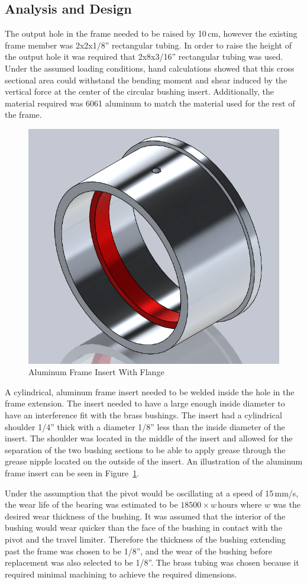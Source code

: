 \subsection{Analysis and Design}
The output hole in the frame needed to be raised by 10\,cm, however the existing frame member was 2x2x1/8'' rectangular tubing. In order to raise the height of the output hole it was required that 2x8x3/16'' rectangular tubing was used. Under the assumed loading conditions, hand calculations showed that this cross sectional area could withstand the bending moment and shear induced by the vertical force at the center of the circular bushing insert. Additionally, the material required was 6061 aluminum to match the material used for the rest of the frame. 
\begin{figure}[H]
\centering
\includegraphics[width=0.25\linewidth]{./images/frame_insert_iso_rndr}
\caption{Aluminum Frame Insert With Flange}
\label{fig:frame_insert_iso_rndr}
\end{figure}

A cylindrical, aluminum frame insert needed to be welded inside the hole in the frame extension. The insert needed to have a large enough inside diameter to have an interference fit with the brass bushings. The insert had a cylindrical shoulder 1/4'' thick with a diameter 1/8'' less than the inside diameter of the insert. The shoulder was located in the middle of the insert and allowed for the separation of the two bushing sections to be able to apply grease through the grease nipple located on the outside of the insert. An illustration of the aluminum frame insert can be seen in Figure~\ref{fig:frame_insert_iso_rndr}.

Under the assumption that the pivot would be oscillating at a speed of 15\,mm/s, the wear life of the bearing was estimated to be $18500\times w\,\text{hours}$ where $w$ was the desired wear thickness of the bushing. It was assumed that the interior of the bushing would wear quicker than the face of the bushing in contact with the pivot and the travel limiter. Therefore the thickness of the bushing extending past the frame was chosen to be 1/8'', and the wear of the bushing before replacement was also selected to be 1/8''. The brass tubing was chosen because it required minimal machining to achieve the required dimensions. 